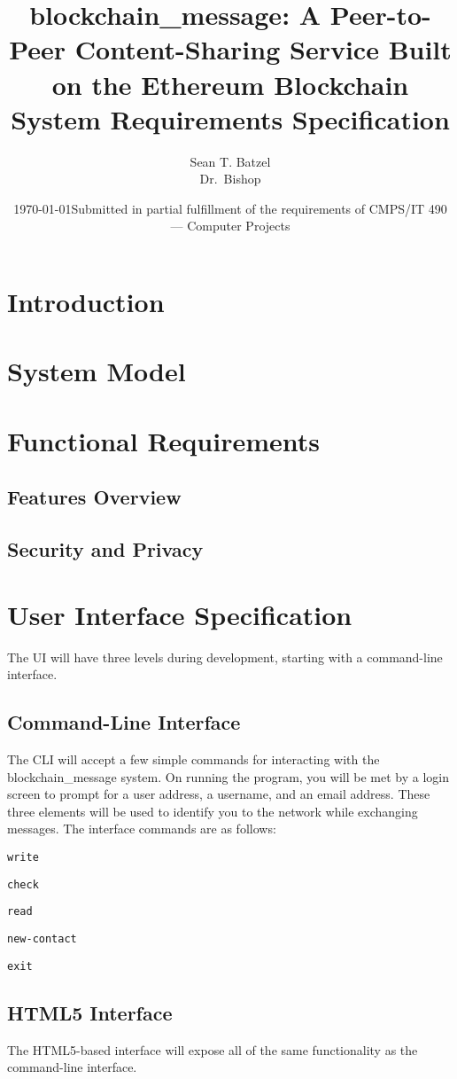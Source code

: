 \documentclass[titlepage]{report}
\title{blockchain\_message: A Peer-to-Peer Content-Sharing Service Built on the Ethereum Blockchain\\\large System Requirements Specification}
\author{Sean T. Batzel\\Dr.\ Bishop}
\date{\today\endgraf\bigskip Submitted in partial fulfillment of the requirements of CMPS/IT 490 --- Computer Projects}
\begin{document}
\maketitle

\nocite{*}

\section{Introduction}

\section{System Model}

\section{Functional Requirements}
\subsection{Features Overview}
\subsection{Security and Privacy}

\section{User Interface Specification}
The UI will have three levels during development, starting with a command-line interface.

\subsection{Command-Line Interface}
The CLI will accept a few simple commands for interacting with the blockchain\_message system. On running the program, you will be met by a login screen to prompt for a user address, a username, and an email address. These three elements will be used to identify you to the network while exchanging messages.
The interface commands are as follows:

\texttt{write}

\texttt{check}

\texttt{read}

\texttt{new-contact}

\texttt{exit}

\subsection{HTML5 Interface}
The HTML5-based interface will expose all of the same functionality as the command-line interface.
\end{document}
